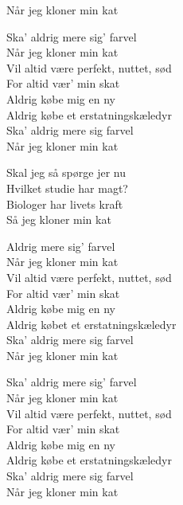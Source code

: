 \begin{song}{Når jeg kloner min kat}
  \begin{SBChorus}
    Ska' aldrig mere sig' farvel\\
    Når jeg kloner min kat\\
    Vil altid være perfekt, nuttet, sød\\
    For altid vær' min skat\\
    Aldrig købe mig en ny\\
    Aldrig købe et erstatningskæledyr\\
    Ska' aldrig mere sig farvel\\
    Når jeg kloner min kat
  \end{SBChorus}


  \begin{SBSection*}
    Skal jeg så spørge jer nu\\
    Hvilket studie har magt?\\
    Biologer har livets kraft\\
    Så jeg kloner min kat
  \end{SBSection*}

  \begin{SBChorus}
    Aldrig mere sig' farvel\\
    Når jeg kloner min kat\\
    Vil altid være perfekt, nuttet, sød\\
    For altid vær' min skat\\
    Aldrig købe mig en ny\\
    Aldrig købet et erstatningskæledyr\\
    Ska' aldrig mere sig farvel\\
    Når jeg kloner min kat
  \end{SBChorus}

  \begin{SBChorus}
    Ska' aldrig mere sig' farvel\\
    Når jeg kloner min kat\\
    Vil altid være perfekt, nuttet, sød\\
    For altid vær' min skat\\
    Aldrig købe mig en ny\\
    Aldrig købe et erstatningskæledyr\\
    Ska' aldrig mere sig farvel\\
    Når jeg kloner min kat
  \end{SBChorus}


\end{song}
